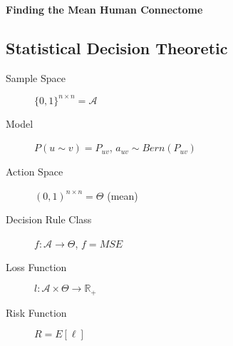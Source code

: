 \documentclass[12pt]{article}
\begin{document}
\begin{center}\Large \bf Finding the Mean Human Connectome \end{center}
\bigskip

\subsection*{Statistical Decision Theoretic}

\begin{description}

\item[Sample Space]  $\{0,1\}^{n\times n}=\mathcal{A}$

\item[Model] $P(u\sim v) = P_{uv}$,  $a_{uv}\sim Bern(P_{uv})$ 

\item[Action Space]
$(0,1)^{n\times n} = \Theta$ (mean)

\item[Decision Rule Class]
$ f: \mathcal{A} \to \Theta$, $f = MSE$

\item[Loss Function]
$l:  \mathcal{A} \times \Theta \rightarrow \mathbb{R}_+$

\item[Risk Function]
$  R = E[\ell]$
\end{description}
\end{document}

